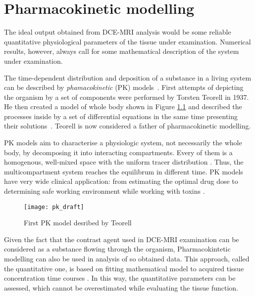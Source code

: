 \chapter{Pharmacokinetic modelling}
\label{chapter:pk}

The ideal output obtained from DCE-MRI analysis would be some reliable quantitative physiological parameters of the tissue under examination. Numerical results, however, always call for some mathematical description of the system under examination. 

The time-dependent distribution and deposition of a substance in a living system can be described by \textit{phamacokinetic} (PK) models~\cite{gerlowski1983physiologically}. First attempts of depicting the organism by a set of components were performed by Torsten Teorell in 1937. He then created a model of whole body shown in Figure \ref{fig:pk_draft} and described the processes inside by a set of differential equations in the same time presenting  their solutions~\cite{pkfather}. Teorell is now considered  a father of pharmacokinetic modelling. 


PK models aim to characterise a physiologic system, not necessarily the whole body, by decomposing it into interacting compartments. Every of them is a homogenous, well-mixed space with the uniform tracer distribution \cite{PMID:20540902}.
Thus, the multicompartment system reaches the equilibrum in different time.  PK models have very wide clinical application: from estimating the optimal drug dose to determining safe working environment while working with toxins  \cite{gerlowski1983physiologically}.


\begin{figure}[H]
		\centering
		\texttt{[image: pk\_draft]}
		\caption [Teorell's first PK model]{First PK model desribed by Teorell \cite{pkfather}}
		\label{fig:pk_draft}
	\end{figure}

\vspace{1cm}
Given the fact that the contrast agent used in DCE-MRI examination can be considered as a substance flowing through the organism, Pharmacokintetic modelling can also be used in analysis of so obtained data.   
This approach, called the quantitative one, is based on fitting mathematical model to acquired tissue concentration time courses \cite{khalifa2014models, jackson2005dynamic, barnes2012practical}. In this way, the quantitative parameters can be assessed, which cannot be overestimated while evaluating the tissue function. 



